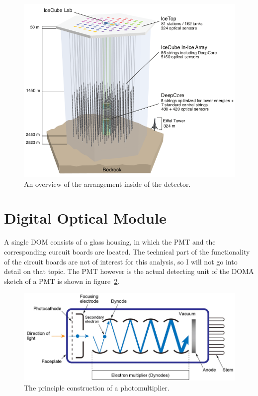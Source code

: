 \begin{figure}[htbp]
    \centering
    \includegraphics[width=\textwidth]{content/pictures/icecube_sketch_01.png}
    \caption{An overview of the arrangement inside of the detector.}\label{fig:icecube_sketch_01}
\end{figure}

\section{Digital Optical Module}\label{sec:dom}

A single DOM consists of a glass housing, in which the PMT and the corresponding curcuit boards are located. The technical part of the functionality of 
the circuit boards are not of interest for this analysis, so I will not go into detail on that topic. The PMT however is the actual detecting unit of 
the DOM\. A sketch of a PMT is shown in figure~\ref{fig:pmt01}.

\begin{figure}[htbp]
    \centering
    \includegraphics[width=\textwidth]{content/pictures/pmt_sketch_01.png}
    \caption{The principle construction of a photomultiplier.}\label{fig:pmt01}
\end{figure}

